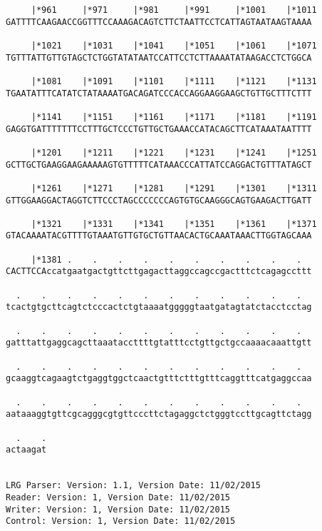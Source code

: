 \documentclass{article}
\begin{document}
\begin{Verbatim}
     |*961     |*971     |*981     |*991     |*1001    |*1011
GATTTTCAAGAACCGGTTTCCAAAGACAGTCTTCTAATTCCTCATTAGTAATAAGTAAAA
                                                            
     |*1021    |*1031    |*1041    |*1051    |*1061    |*1071
TGTTTATTGTTGTAGCTCTGGTATATAATCCATTCCTCTTAAAATATAAGACCTCTGGCA
                                                            
     |*1081    |*1091    |*1101    |*1111    |*1121    |*1131
TGAATATTTCATATCTATAAAATGACAGATCCCACCAGGAAGGAAGCTGTTGCTTTCTTT
                                                            
     |*1141    |*1151    |*1161    |*1171    |*1181    |*1191
GAGGTGATTTTTTTCCTTTGCTCCCTGTTGCTGAAACCATACAGCTTCATAAATAATTTT
                                                            
     |*1201    |*1211    |*1221    |*1231    |*1241    |*1251
GCTTGCTGAAGGAAGAAAAAGTGTTTTTCATAAACCCATTATCCAGGACTGTTTATAGCT
                                                            
     |*1261    |*1271    |*1281    |*1291    |*1301    |*1311
GTTGGAAGGACTAGGTCTTCCCTAGCCCCCCCAGTGTGCAAGGGCAGTGAAGACTTGATT
                                                            
     |*1321    |*1331    |*1341    |*1351    |*1361    |*1371
GTACAAAATACGTTTTGTAAATGTTGTGCTGTTAACACTGCAAATAAACTTGGTAGCAAA
                                                            
     |*1381 .    .    .    .    .    .    .    .    .    .  
CACTTCCAccatgaatgactgttcttgagacttaggccagccgactttctcagagccttt
                                                            
  .    .    .    .    .    .    .    .    .    .    .    .  
tcactgtgcttcagtctcccactctgtaaaatgggggtaatgatagtatctacctcctag
                                                            
  .    .    .    .    .    .    .    .    .    .    .    .  
gatttattgaggcagcttaaataccttttgtatttcctgttgctgccaaaacaaattgtt
                                                            
  .    .    .    .    .    .    .    .    .    .    .    .  
gcaaggtcagaagtctgaggtggctcaactgtttctttgtttcaggtttcatgaggccaa
                                                            
  .    .    .    .    .    .    .    .    .    .    .    .  
aataaaggtgttcgcagggcgtgttcccttctagaggctctgggtccttgcagttctagg
                                                            
  .    .
actaagat
        
        
LRG Parser: Version: 1.1, Version Date: 11/02/2015
Reader: Version: 1, Version Date: 11/02/2015
Writer: Version: 1, Version Date: 11/02/2015
Control: Version: 1, Version Date: 11/02/2015
\end{Verbatim}
\end{document}
